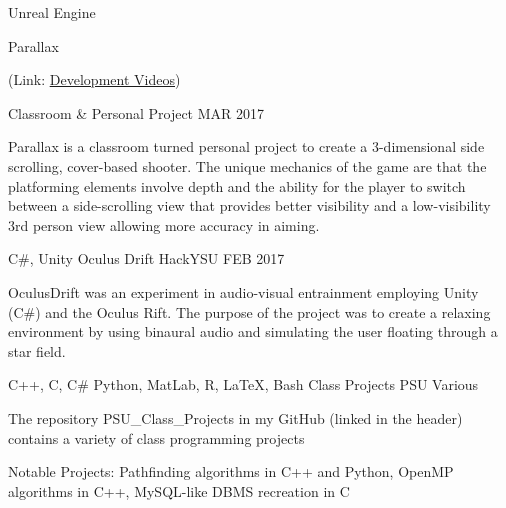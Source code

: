 
\vspace{-.5em}
\begin{cventries}

	\cventry
	{{\color{awesome} Unreal Engine}} %
	{Parallax \begin{footnotesize}{(Link: \href{https://www.youtube.com/playlist?list=PLJCbmN5AjE1XUlgY5KwFnwDh3gmhvtiSC}{\color{awesome}\underline{Development Videos}})}\end{footnotesize}} %
	{Classroom \& Personal Project} %
	{MAR 2017} %
	{
		\begin{cvitems} %
			\item {Parallax is a classroom turned personal project to create a 3-dimensional side scrolling, cover-based shooter. The unique mechanics of the game are that the platforming elements involve depth and the ability for the player to switch between a side-scrolling view that provides better visibility and a low-visibility 3rd person view allowing more accuracy in aiming.}
		\end{cvitems}
	}
	
	\cventry
	{{\color{awesome} C\#, Unity}} %
	{Oculus Drift} %
	{HackYSU} %
	{FEB 2017} %
	{
		\begin{cvitems} %
			\item {OculusDrift was an experiment in audio-visual entrainment employing Unity (C\#) and the Oculus Rift. The purpose of the project was to create a relaxing environment by using binaural audio and simulating the user floating through a star field.}
		\end{cvitems}
	}
	
	\cventry
	{{\color{awesome} C++, C, C\# Python, MatLab, R, LaTeX, Bash}} %
	{Class Projects} %
	{PSU} %
	{Various} %
	{
	\begin{cvitems} %
		\item {The repository PSU\_Class\_Projects in my GitHub (linked in the header) contains a variety of class programming projects 
		\item Notable Projects: Pathfinding algorithms in C++ and Python, OpenMP algorithms in C++, MySQL-like DBMS recreation in C}
	\end{cvitems}
	}
	
\end{cventries}